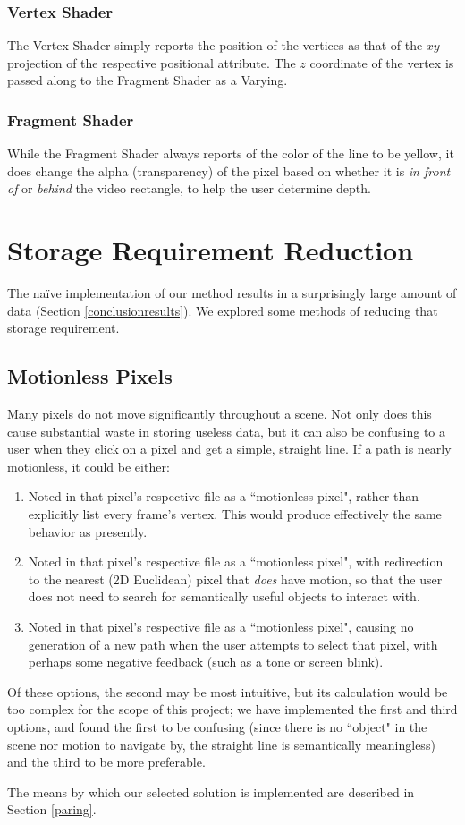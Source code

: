 \subsubsection{Vertex Shader}
The Vertex Shader simply reports the position of the vertices as that of the $xy$ projection of the respective positional attribute. The $z$ coordinate of the vertex is passed along to the Fragment Shader as a Varying.

\subsubsection{Fragment Shader}
While the Fragment Shader always reports of the color of the line to be yellow, it does change the alpha (transparency) of the pixel based on whether it is \emph{in front of} or \emph{behind} the video rectangle, to help the user determine depth.

\section{Storage Requirement Reduction}
The na{\"i}ve implementation of our method results in a surprisingly large amount of data (Section \ref{conclusionresults}). We explored some methods of reducing that storage requirement.

\subsection{Motionless Pixels}
\label{motionless}
    Many pixels do not move significantly throughout a scene. Not only does this cause substantial waste in storing useless data, but it can also be confusing to a user when they click on a pixel and get a simple, straight line. If a path is nearly motionless, it could be either:
    \begin{enumerate}
        \item Noted in that pixel's respective file as a ``motionless pixel", rather than explicitly list every frame's vertex. This would produce effectively the same behavior as presently.
        \item Noted in that pixel's respective file as a ``motionless pixel", with redirection to the nearest (2D Euclidean) pixel that \emph{does} have motion, so that the user does not need to search for semantically useful objects to interact with.
        \item Noted in that pixel's respective file as a ``motionless pixel", causing no generation of a new path when the user attempts to select that pixel, with perhaps some negative feedback (such as a tone or screen blink).
    \end{enumerate}
    \par Of these options, the second may be most intuitive, but its calculation would be too complex for the scope of this project; we have implemented the first and third options, and found the first to be confusing (since there is no ``object" in the scene nor motion to navigate by, the straight line is semantically meaningless) and the third to be more preferable.
    \par The means by which our selected solution is implemented are described in Section \ref{paring}.

